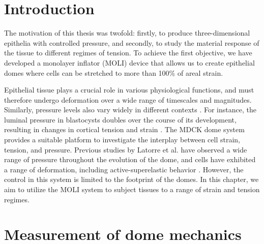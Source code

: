 \hypertarget{introduction}{%
\section{Introduction}\label{introduction2}}

The motivation of this thesis was twofold: firstly, to produce three-dimensional epithelia with controlled pressure, and secondly, to study the material response of the tissue to different regimes of tension. To achieve the first objective, we have developed a monolayer inflator (MOLI) device that allows us to create epithelial domes where cells can be stretched to more than 100\% of areal strain.

Epithelial tissue plays a crucial role in various physiological functions, and must therefore undergo deformation over a wide range of timescales and magnitudes. Similarly, pressure levels also vary widely in different contexts \cite{torres-sanchez2021, choudhury2022a}. For instance, the luminal pressure in blastocysts doubles over the course of its development, resulting in changes in cortical tension and strain \cite{chan2019}. The MDCK dome system provides a suitable platform to investigate the interplay between cell strain, tension, and pressure. Previous studies by Latorre et al. have observed a wide range of pressure throughout the evolution of the dome, and cells have exhibited a range of deformation, including active-superelastic behavior \cite{latorre2018}. However, the control in this system is limited to the footprint of the domes. In this chapter, we aim to utilize the MOLI system to subject tissues to a range of strain and tension regimes.

\hypertarget{measurement-of-dome-mechanics}{%
	\section{Measurement of dome
		mechanics}\label{measurement-of-dome-mechanics}}


